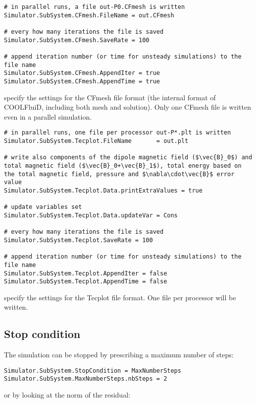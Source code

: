 \documentclass[11pt]{article}
\begin{document}
\begin{lstlisting}[breaklines]
# in parallel runs, a file out-P0.CFmesh is written
Simulator.SubSystem.CFmesh.FileName = out.CFmesh  

# every how many iterations the file is saved  
Simulator.SubSystem.CFmesh.SaveRate = 100

# append iteration number (or time for unsteady simulations) to the file name  	
Simulator.SubSystem.CFmesh.AppendIter = true
Simulator.SubSystem.CFmesh.AppendTime = true
\end{lstlisting}
specify the settings for the CFmesh file format (the internal format of COOLFluiD, including both mesh and solution).
Only one CFmesh file is written even in a parallel simulation. 

\begin{lstlisting}[breaklines,mathescape]
# in parallel runs, one file per processor out-P*.plt is written
Simulator.SubSystem.Tecplot.FileName       = out.plt

# write also components of the dipole magnetic field ($\vec{B}_0$) and total magnetic field ($\vec{B}_0+\vec{B}_1$), total energy based on the total magnetic field, pressure and $\nabla\cdot\vec{B}$ error value
Simulator.SubSystem.Tecplot.Data.printExtraValues = true  

# update variables set
Simulator.SubSystem.Tecplot.Data.updateVar = Cons

# every how many iterations the file is saved  
Simulator.SubSystem.Tecplot.SaveRate = 100

# append iteration number (or time for unsteady simulations) to the file name
Simulator.SubSystem.Tecplot.AppendIter = false       
Simulator.SubSystem.Tecplot.AppendTime = false
\end{lstlisting}
specify the settings for the Tecplot file format. One file per processor will be written. 

\subsection{Stop condition}

The simulation can be stopped by prescribing a maximum number of steps:

\begin{lstlisting}[breaklines]
Simulator.SubSystem.StopCondition = MaxNumberSteps
Simulator.SubSystem.MaxNumberSteps.nbSteps = 2
\end{lstlisting}
or by looking at the norm of the residual:
\end{document}
